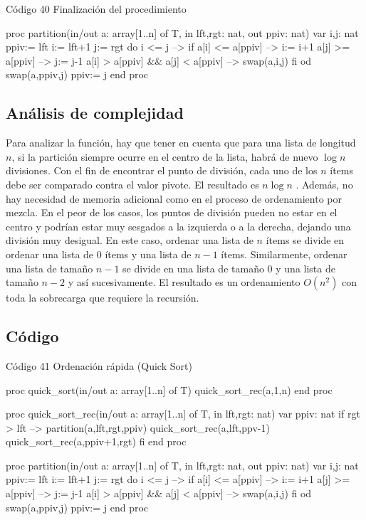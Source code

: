 \begin{codebox}{Código 40}
\footnotesize Finalización del procedimiento
\tcblower
\begin{pascallike}
proc partition(in/out a: array[1..n] of T, in lft,rgt: nat, out ppiv: nat)
    var i,j: nat
    ppiv:= lft
    i:= lft+1
    j:= rgt
    do i <= j --> if a[i] <= a[ppiv] --> i:= i+1
                        a[j] >= a[ppiv] --> j:= j-1
                        a[i] > a[ppiv] && a[j] < a[ppiv] --> swap(a,i,j)
                    fi
    od
    swap(a,ppiv,j)
    ppiv:= j
end proc
\end{pascallike}
\end{codebox}

\subsection{Análisis de complejidad}
Para analizar la función, hay que tener en cuenta que para una lista de longitud $n$, si la partición siempre ocurre en el centro de la lista, habrá de nuevo $\log n$ divisiones. Con el fin de encontrar el punto de división, cada uno de los $n$ ítems debe ser comparado contra el valor pivote. El resultado es $n\log n$ . Además, no hay necesidad de memoria adicional como en el proceso de ordenamiento por mezcla.
En el peor de los casos, los puntos de división pueden no estar en el centro y podrían estar muy sesgados a la izquierda o a la derecha, dejando una división muy desigual. En este caso, ordenar una lista de $n$ ítems se divide en ordenar una lista de $0$ ítems y una lista de $n-1$ ítems. Similarmente, ordenar una lista de tamaño $n-1$ se divide en una lista de tamaño $0$ y una lista de tamaño $n-2$ y así sucesivamente. El resultado es un ordenamiento $O(n^2)$ con toda la sobrecarga que requiere la recursión.

\subsection{Código}

\begin{codebox}{Código 41}
\footnotesize Ordenación rápida (Quick Sort)
\tcblower
\begin{pascallike}
proc quick_sort(in/out a: array[1..n] of T)
    quick_sort_rec(a,1,n)
end proc

proc quick_sort_rec(in/out a: array[1..n] of T, in lft,rgt: nat)
    var ppiv: nat
    if rgt > lft --> 
        partition(a,lft,rgt,ppiv)
        quick_sort_rec(a,lft,ppv-1)
        quick_sort_rec(a,ppiv+1,rgt)
    fi
end proc

proc partition(in/out a: array[1..n] of T, in lft,rgt: nat, out ppiv: nat)
    var i,j: nat
    ppiv:= lft
    i:= lft+1
    j:= rgt
    do i <= j --> if a[i] <= a[ppiv] --> i:= i+1
                        a[j] >= a[ppiv] --> j:= j-1
                        a[i] > a[ppiv] && a[j] < a[ppiv] --> swap(a,i,j)
                    fi
    od
    swap(a,ppiv,j)
    ppiv:= j
end proc
\end{pascallike}
\end{codebox}